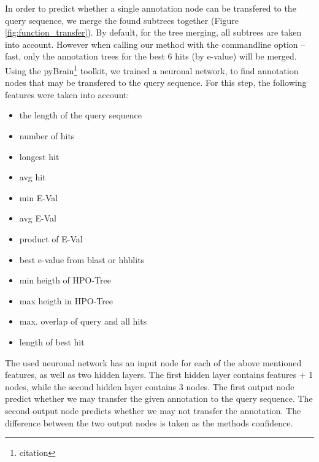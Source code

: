 In order to predict whether a single annotation node can be transfered to the query sequence, we merge the found subtrees together (Figure \ref{fig:function_transfer}). By default, for the tree merging,
all subtrees are taken into account. However when calling our method with the commandline option --fast, only the annotation trees for the best 6 hits (by e-value) will be merged.\newline
Using the pyBrain\footnote{citation} toolkit, we trained a neuronal network, to find annotation nodes that may be transfered to the query sequence. For this step, the following features were taken into
account:
\begin{itemize}
\item the length of the query sequence
\item number of hits
\item longest hit
\item avg hit
\item min E-Val
\item avg E-Val
\item product of E-Val
\item best e-value from blast or hhblits
\item min heigth of HPO-Tree
\item max heigth in HPO-Tree
\item max. overlap of query and all hits
\item length of best hit
\end{itemize}
The used neuronal network has an input node for each of the above mentioned features, as well as two hidden layers. The first hidden layer contains features + 1 nodes, while the second hidden layer
contains 3 nodes. The first output node predict whether we may transfer the given annotation to the query sequence. The second output node predicts whether we may not transfer the annotation.
The difference between the two output nodes is taken as the methods confidence.
